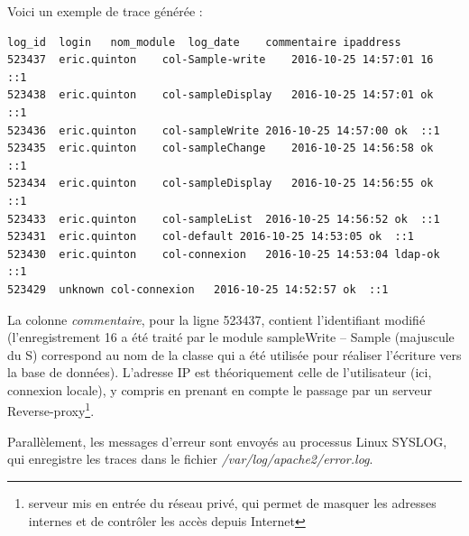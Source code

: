 Voici un exemple de trace générée :
\begin{lstlisting}
log_id	login	nom_module	log_date	commentaire	ipaddress
523437	eric.quinton	col-Sample-write	2016-10-25 14:57:01	16	::1
523438	eric.quinton	col-sampleDisplay	2016-10-25 14:57:01	ok	::1
523436	eric.quinton	col-sampleWrite	2016-10-25 14:57:00	ok	::1
523435	eric.quinton	col-sampleChange	2016-10-25 14:56:58	ok	::1
523434	eric.quinton	col-sampleDisplay	2016-10-25 14:56:55	ok	::1
523433	eric.quinton	col-sampleList	2016-10-25 14:56:52	ok	::1
523431	eric.quinton	col-default	2016-10-25 14:53:05	ok	::1
523430	eric.quinton	col-connexion	2016-10-25 14:53:04	ldap-ok	::1
523429	unknown	col-connexion	2016-10-25 14:52:57	ok	::1
\end{lstlisting}

La colonne \textit{commentaire}, pour la ligne 523437, contient l'identifiant modifié (l'enregistrement 16 a été traité par le module sampleWrite -- Sample (majuscule du S) correspond au nom de la classe qui a été utilisée pour réaliser l'écriture vers la base de données). L'adresse IP est théoriquement celle de l'utilisateur (ici, connexion locale), y compris en prenant en compte le passage par un serveur Reverse-proxy\footnote{serveur mis en entrée du réseau privé, qui permet de masquer les adresses internes et de contrôler les accès depuis Internet}.

Parallèlement, les messages d'erreur sont envoyés au processus Linux SYSLOG, qui enregistre les traces dans le fichier \textit{/var/log/apache2/error.log}.